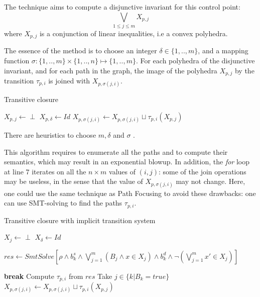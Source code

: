\documentclass[a4paper,english,titlepage,11pt]{article}
\begin{document}
	The technique aims to compute a disjunctive invariant for this control
	point: 
	$$\displaystyle\bigvee_{1 \leq j \leq m} X_{p,j}$$
	where $X_{p,j}$ is a conjunction of linear inequalities, i.e a convex
	polyhedra.

	The essence of the method is to
	choose an integer $\delta \in \{1,..,m\}$, and a mapping function
	$\sigma: \{1,..,m\} \times \{1,..,n\} \mapsto \{1,..,m\}$.
	For each polyhedra of the disjunctive invariant, and for each path in the
	graph, the image of the polyhedra $X_{p,j}$ by the transition
	$\tau_{p,i}$ is joined with $X_{p,\sigma(j,i)}$.

\begin{algorithm}
\caption{Transitive closure}\label{gulwani}
\begin{algorithmic}[1] 
	\State $X_{p,j} \gets \perp$
\EndFor
\State $X_{p,\delta} \gets Id$
\Repeat
		\State $X_{p,\sigma(j,i)} \gets X_{p,\sigma(j,i)} \sqcup
		\tau_{p,i}(X_{p,j})$
	\EndFor
{}
\EndProcedure
\end{algorithmic}
\end{algorithm}

There are heuristics to choose $m,\delta$ and $\sigma$ \cite[Section
5]{GulwaniZ10}.

This algorithm requires to enumerate all the paths and to compute their
semantics, which may result in an exponential blowup. In addition, the
\emph{for} loop at line $7$ iterates on all the $n \times m$ values of $(i,j)$:
some of the join operations may be useless, in the sense that the value of 
$X_{p,\sigma(j,i)}$ may not change. Here, one could use the same technique as
Path Focusing to avoid these drawbacks: one can use SMT-solving to find the
paths $\tau_{p,i}$.

\begin{algorithm}[!h]
\caption{Transitive closure with implicit transition system}\label{gulwani2}
\begin{algorithmic}[1] 
	\State $X_{j} \gets \perp$
\EndFor
\State $X_{\delta} \gets Id$

		\State $res \gets SmtSolve\left[\rho \wedge b_k^s \wedge
		\bigvee_{j=1}^m (B_j \wedge x \in X_{j})
		\wedge b_k^d
		\wedge \neg \left(\bigvee_{j=1}^m x' \in X_{j}\right)\right]$

		\State \textbf{break}
	\EndIf
	\State Compute $\tau_{p,i}$ from $res$ 
	\State Take $j \in \{ k | B_k = true\}$ 
	\State $X_{p,\sigma(j,i)} \gets X_{p,\sigma(j,i)} \sqcup
	\tau_{p,i}(X_{p,j})$
\EndWhile
\EndProcedure
\end{algorithmic}
\end{algorithm}
\end{document}
